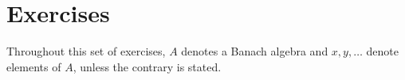 
\section{Exercises} %

Throughout this set of exercises,
$A$ denotes a Banach algebra and \(x, y, \ldots\) denote
elements of $A$, unless the contrary is stated.

